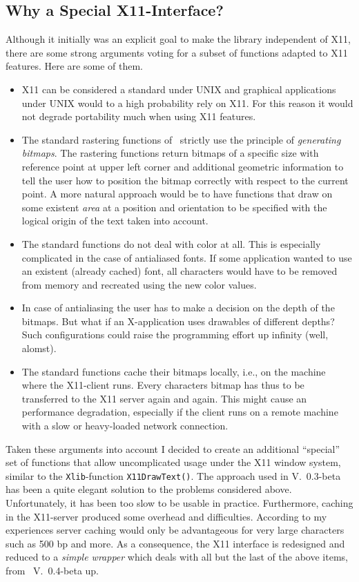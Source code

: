 \subsection{Why a Special X11-Interface?}
Although it initially was an explicit goal to make the library independent of
X11, there are some strong arguments voting for a subset of functions adapted
to X11 features. Here are some of them.
\begin{itemize}
\item X11 can be considered a standard under UNIX and graphical applications
  under UNIX would to a high probability rely on X11. For this reason it would
  not degrade portability much when using X11 features.
\item The standard rastering functions of \tonelib\ strictly use the principle
  of {\em generating bitmaps}. The rastering functions return bitmaps of a
  specific size with reference point at upper left corner and additional
  geometric information to tell the user how to position the bitmap correctly
  with respect to the current point. A more natural approach would be to have
  functions that draw on some existent {\em area} at a position and
  orientation to be specified with the logical origin of the text taken into
  account.
\item The standard functions do not deal with color at all. This is especially
  complicated in the case of antialiased fonts. If some application wanted to
  use an existent (already cached) font, all characters would have to be
  removed from memory and recreated using the new color values.
\item In case of antialiasing the user has to make a decision on the depth of
  the bitmaps. But what if an X-application uses drawables of different depths?
  Such configurations could raise the programming effort up infinity (well,
  alomst). 
\item The standard functions cache their bitmaps locally, i.e., on the machine
  where the X11-client runs. Every characters bitmap has thus to be 
  transferred to the X11 server again and again. This might cause an
  performance degradation, especially if the client runs on a remote machine
  with a slow or heavy-loaded network connection.
\end{itemize}
Taken these arguments into account I decided to create an additional
``special'' set of functions that allow uncomplicated usage under the X11
window system, similar to the \verb+Xlib+-function \verb+X11DrawText()+. 
The approach used in V.~0.3-beta has been a quite elegant solution
to the problems considered above. Unfortunately, it has been too slow to be
usable in practice. Furthermore, caching in the X11-server produced some
overhead and difficulties. According to my experiences server caching would
only be advantageous for very large characters such as 500 bp and more. As a
consequence, the X11 interface is redesigned and reduced to a {\em simple
  wrapper} which deals with all but the last of the above items, from
\tonelib\ V.~0.4-beta up.


